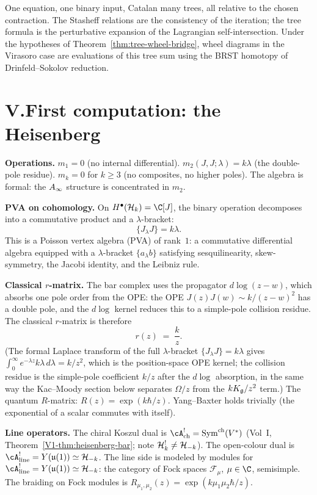 One equation, one binary input, Catalan many trees, all relative to
the chosen contraction. The Stasheff relations are the consistency of
the iteration; the tree formula is the perturbative expansion of the
Lagrangian self-intersection. Under the hypotheses of
Theorem~\ref{thm:tree-wheel-bridge}, wheel diagrams in the Virasoro
case are evaluations of this tree sum using the BRST homotopy of
Drinfeld--Sokolov reduction.


\section*{V.\quad First computation: the Heisenberg}

\noindent\textbf{Operations.}\enspace
$m_1 = 0$ (no internal differential).
$m_2(J,J;\lambda) = k\lambda$ (the double-pole residue).
$m_k = 0$ for $k \ge 3$ (no composites, no higher poles).
The algebra is formal: the $A_\infty$ structure is concentrated in
$m_2$.

\smallskip
\noindent\textbf{PVA on cohomology.}\enspace
On $H^\bullet(\cH_k) = \C[J]$, the binary operation decomposes
into a commutative product and a $\lambda$-bracket:
\[
\{J_\lambda J\} = k\lambda.
\]
This is a Poisson vertex algebra (PVA) of rank~$1$: a commutative differential algebra equipped with a $\lambda$-bracket $\{a_\lambda b\}$ satisfying sesquilinearity, skew-symmetry, the Jacobi identity, and the Leibniz rule.

\smallskip
\noindent\textbf{Classical $r$-matrix.}\enspace
The bar complex uses the propagator $d\log(z-w)$, which absorbs one pole order from the OPE: the OPE $J(z)J(w)\sim k/(z-w)^2$ has a double pole, and the $d\log$ kernel reduces this to a simple-pole collision residue. The classical $r$-matrix is therefore
\[
r(z) \;=\; \frac{k}{z}.
\]
(The formal Laplace transform of the full $\lambda$-bracket $\{J_\lambda J\}=k\lambda$ gives $\int_0^\infty e^{-\lambda z}k\lambda\,d\lambda = k/z^2$, which is the position-space OPE kernel; the collision residue is the simple-pole coefficient $k/z$ after the $d\log$ absorption, in the same way the Kac--Moody section below separates $\Omega/z$ from the $kK_{\mathfrak{g}}/z^2$ term.)
The quantum $R$-matrix: $R(z) = \exp(k\hbar/z)$. Yang--Baxter
holds trivially (the exponential of a scalar commutes with itself).

\smallskip
\noindent\textbf{Line operators.}\enspace
The chiral Koszul dual is
$\cA^!_{\mathrm{ch}} = \mathrm{Sym}^{\mathrm{ch}}(V^*)$
(Vol~I, Theorem~\ref*{V1-thm:heisenberg-bar}; note
$\mathcal{H}_k^!\neq\mathcal{H}_{-k}$). The open-colour dual is
$\cA^!_{\mathrm{line}} = Y(\mathfrak{u}(1)) \simeq \cH_{-k}$.
The line side is modeled by modules for
$\cA^!_{\mathrm{line}} = Y(\mathfrak{u}(1)) \simeq \cH_{-k}$:
the category of Fock spaces $\mathcal{F}_\mu$, $\mu \in \C$,
semisimple. The braiding on Fock modules is
$R_{\mu_1,\mu_2}(z) = \exp(k\mu_1\mu_2\hbar/z)$.

